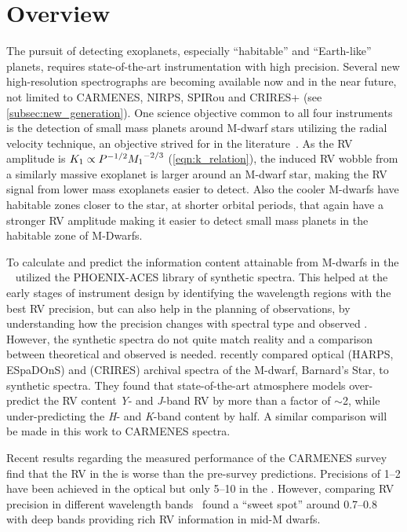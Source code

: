 \section{Overview}
\label{sec:precision_overview}
The pursuit of detecting exoplanets, especially ``habitable'' and ``Earth-like'' planets, requires state-of-the-art instrumentation with high precision.
Several new high-resolution \nir{} spectrographs are becoming available now and in the near future, not limited to {CARMENES}, {NIRPS}, {SPIRou} and {CRIRES+} (see \cref{subsec:new_generation}).
One science objective common to all four instruments is the detection of small mass planets around {M-dwarf} stars utilizing the radial velocity technique, an objective strived for in the literature~\citep[e.g.][]{reiners_detecting_2010, rodler_detecting_2011a, plavchan_radial_2015}.
As the {RV} amplitude is \({K}_{1}\propto {P}^{-{1/2}}{{M}_{1}}^{-2/3}\) (\cref{eqn:k_relation}), the induced {RV} wobble from a similarly massive exoplanet is larger around an M-dwarf star, making the {RV} signal from lower mass exoplanets easier to detect.
Also the cooler {M-dwarfs} have habitable zones closer to the star, at shorter orbital periods, that again have a stronger {RV} amplitude making it easier to detect small mass planets in the habitable zone of {M-Dwarfs}.

To calculate and predict the information content attainable from {M-dwarfs} in the \nir{,}~\citet{figueira_radial_2016} utilized the {PHOENIX-ACES} library of synthetic spectra.
This helped at the early stages of instrument design by identifying the wavelength regions with the best {RV} precision, but can also help in the planning of observations, by understanding how the precision changes with spectral type and observed {\snr{}}.
However, the synthetic spectra do not quite match reality and a comparison between theoretical and observed is needed.
\citet{artigau_optical_2018} recently compared optical ({HARPS}, {ESpaDOnS}) and \nir{} ({CRIRES}) archival spectra of the {M-dwarf}, Barnard's Star, to synthetic spectra.
They found that state-of-the-art atmosphere models over-predict the {RV} content \emph{Y}- and \emph{J}-band {RV} by more than a factor of \(\sim\)2, while under-predicting the \emph{H}- and \emph{K}-band content by half.
A similar comparison will be made in this work to {CARMENES} spectra.

Recent results regarding the measured performance of the {CARMENES} survey~\citep{reiners_carmenes_2018,quirrenbach_carmenes_2018} find that the {RV} in the \nir{} is worse than the pre-survey predictions.
Precisions of 1--2\mps{} have been achieved in the optical but only 5--10\mps{} in the \nir{}.
However, comparing {RV} precision in different wavelength bands~\citet{quirrenbach_carmenes_2018} found a ``sweet spot'' around 0.7--0.8\um{} with deep  bands providing rich {RV} information in mid-M dwarfs.

